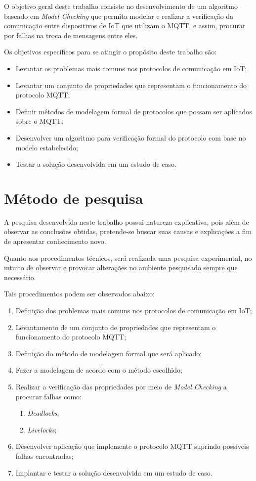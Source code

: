 O objetivo geral deste trabalho consiste no desenvolvimento de um algoritmo baseado em \textit{Model Checking} que permita modelar e realizar a verificação da comunicação entre dispositivos de IoT que utilizam o MQTT, e assim, procurar por falhas na troca de mensagens entre eles.

Os objetivos específicos para se atingir o propósito deste trabalho são:

\begin{itemize}
    \item Levantar os problemas mais comuns nos protocolos de comunicação em IoT;
	\item Levantar um conjunto de propriedades que representam o funcionamento do protocolo MQTT;
	\item Definir métodos de modelagem formal de protocolos que possam ser aplicados sobre o MQTT;
	\item Desenvolver um algoritmo para verificação formal do protocolo com base no modelo estabelecido;
	\item Testar a solução desenvolvida em um estudo de caso.
\end{itemize}

\section{Método de pesquisa}

A pesquisa desenvolvida neste trabalho possui natureza explicativa, pois além de observar as conclusões obtidas, pretende-se buscar suas causas e explicações a fim de apresentar conhecimento novo.

Quanto aos procedimentos técnicos, será realizada uma pesquisa experimental, no intuito de observar e provocar alterações no ambiente pesquisado sempre que necessário.

Tais procedimentos podem ser observados abaixo:

\begin{enumerate}
    \item Definição dos problemas mais comuns nos protocolos de comunicação em IoT;
    \item Levantamento de um conjunto de propriedades que representam o funcionamento do protocolo MQTT;
    \item Definição do método de modelagem formal que será aplicado;
    \item Fazer a modelagem de acordo com o método escolhido;
    \item Realizar a verificação das propriedades por meio de \textit{Model Checking} a procurar falhas como:
        \begin{enumerate}
            \item \textit{Deadlocks};
            \item \textit{Livelocks};
        \end{enumerate}
    \item Desenvolver aplicação que implemente o protocolo MQTT suprindo possíveis falhas encontradas;
    \item Implantar e testar a solução desenvolvida em um estudo de caso.
\end{enumerate}




